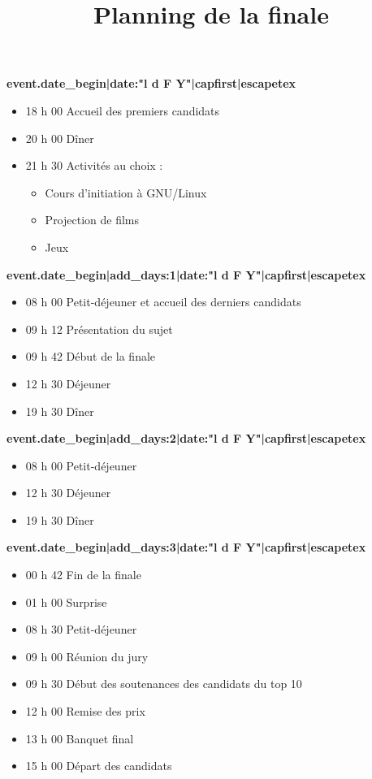 \documentclass[a4paper,11pt]{prologin}
\title{Planning de la finale}
\begin{document}
\noindent
\textbf{ {{ event.date_begin|date:"l d F Y"|capfirst|escapetex }} }

\begin{itemize}
    \item 18 h 00                 Accueil des premiers candidats
    \item 20 h 00                 Dîner
    \item 21 h 30                 Activités au choix :
    \begin{itemize}
	\item[~]            Cours d'initiation à GNU/Linux
	\item[~]            Projection de films
	\item[~]            Jeux
    \end{itemize}
\end{itemize}

\vspace{0.3cm}
\noindent
\textbf{ {{ event.date_begin|add_days:1|date:"l d F Y"|capfirst|escapetex }} }

\begin{itemize}
    \item 08 h 00                 Petit-déjeuner et accueil des derniers candidats
    \item 09 h 12                 Présentation du sujet
    \item 09 h 42                 Début de la finale
    \item 12 h 30                 Déjeuner
    \item 19 h 30                 Dîner
\end{itemize}

\vspace{0.3cm}
\noindent
\textbf{ {{ event.date_begin|add_days:2|date:"l d F Y"|capfirst|escapetex }} }

\begin{itemize}
    \item 08 h 00                 Petit-déjeuner
    \item 12 h 30                 Déjeuner
    \item 19 h 30                 Dîner
\end{itemize}

\vspace{0.3cm}
\noindent
\textbf{ {{ event.date_begin|add_days:3|date:"l d F Y"|capfirst|escapetex }} }

\begin{itemize}
    \item 00 h 42                 Fin de la finale
    \item 01 h 00                 Surprise
    \item 08 h 30                 Petit-déjeuner
    \item 09 h 00                 Réunion du jury
    \item 09 h 30                 Début des soutenances des candidats du top 10
    \item 12 h 00                 Remise des prix
    \item 13 h 00                 Banquet final
    \item 15 h 00                 Départ des candidats
\end{itemize}
\end{document}

